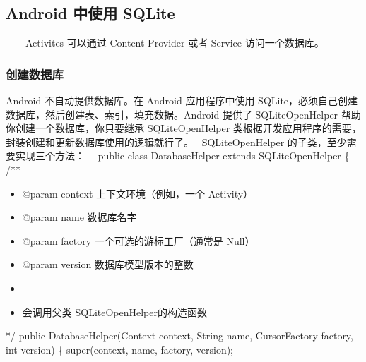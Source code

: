 \documentclass[9pt, b5paper]{article}
\begin{document}
\subsection{Android 中使用 SQLite}
\label{sec-15-3}
　　Activites 可以通过 Content Provider 或者 Service 访问一个数据库。
\subsubsection{创建数据库}
\label{sec-15-3-1}
Android 不自动提供数据库。在 Android 应用程序中使用 SQLite，必须自己创建数据库，然后创建表、索引，填充数据。Android 提供了 SQLiteOpenHelper 帮助你创建一个数据库，你只要继承 SQLiteOpenHelper 类根据开发应用程序的需要，封装创建和更新数据库使用的逻辑就行了。　
SQLiteOpenHelper 的子类，至少需要实现三个方法：　
public class DatabaseHelper extends SQLiteOpenHelper \{
    /**
\begin{itemize}
\item @param context  上下文环境（例如，一个 Activity）
\item @param name   数据库名字
\item @param factory  一个可选的游标工厂（通常是 Null）
\item @param version  数据库模型版本的整数
\item 
\item 会调用父类 SQLiteOpenHelper的构造函数
\end{itemize}
 */ 
public DatabaseHelper(Context context, String name, CursorFactory factory, int version) \{
    super(context, name, factory, version);
\end{document}
